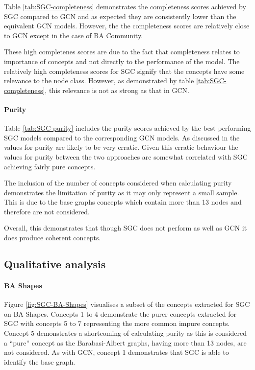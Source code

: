 Table \ref{tab:SGC-completeness} demonstrates the completeness scores achieved by SGC compared to GCN and as expected they are consistently lower than the equivalent GCN models.
However, the the completeness scores are relatively close to GCN except in the case of BA Community.

These high completenes scores are due to the fact that completeness relates to importance of concepts and not directly to the performance of the model.
The relatively high completeness scores for SGC signify that the concepts have some relevance to the node class.
However, as demonstrated by table \ref{tab:SGC-completeness}, this relevance is not as strong as that in GCN.

\paragraph{Purity}


Table \ref{tab:SGC-purity} includes the purity scores achieved by the best performing SGC models compared to the corresponding GCN models.
As discussed in  the values for purity are likely to be very erratic.
Given this erratic behaviour the values for purity between the two approaches are somewhat correlated with SGC achieving fairly pure concepts.

The inclusion of the number of concepts considered when calculating purity demonstrates the limitation of purity as it may only represent a small sample.
This is due to the base graphs concepts which contain more than 13 nodes and therefore are not considered.

Overall, this demonstrates that though SGC does not perform as well as GCN it does produce coherent concepts.

\subsection{Qualitative analysis}
\label{sec:concept-analysis}

\paragraph{BA Shapes}

Figure \ref{fig:SGC-BA-Shapes} visualises a subset of the concepts extracted for SGC on BA Shapes.
Concepts 1 to 4 demonstrate the purer concepts extracted for SGC with concepts 5 to 7 representing the more common impure concepts.
Concept 5 demonstrates a shortcoming of calculating purity as this is considered a ``pure'' concept as the Barabasi-Albert graphs, having more than 13 nodes, are not considered. 
As with GCN, concept 1 demonstrates that SGC is able to identify the base graph.

